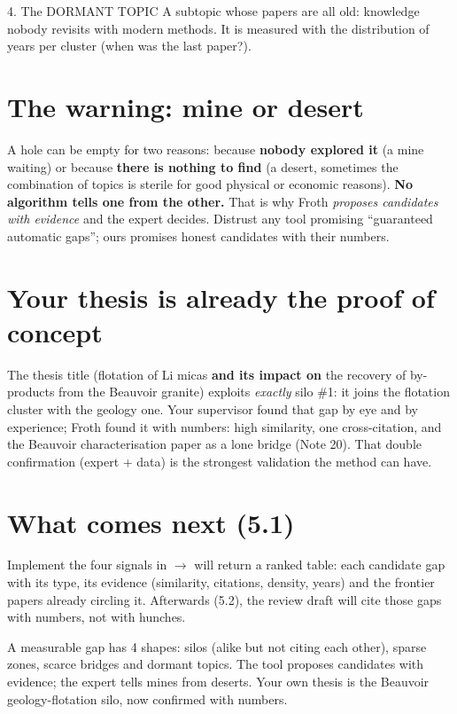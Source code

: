 \documentclass[11pt,a4paper]{article}
\begin{document}
\begin{concepto}{4. The DORMANT TOPIC}
A subtopic whose papers are all old: knowledge nobody revisits with modern methods. It is
measured with the distribution of years per cluster (when was the last paper?).
\end{concepto}

\section{The warning: mine or desert}

\begin{ojo}
A hole can be empty for two reasons: because \textbf{nobody explored it} (a mine waiting) or
because \textbf{there is nothing to find} (a desert, sometimes the combination of topics is
sterile for good physical or economic reasons). \textbf{No algorithm tells one from the
other.} That is why Froth \emph{proposes candidates with evidence} and the expert decides.
Distrust any tool promising ``guaranteed automatic gaps''; ours promises honest candidates
with their numbers.
\end{ojo}

\section{Your thesis is already the proof of concept}

The thesis title (flotation of Li micas \textbf{and its impact on} the recovery of by-products
from the Beauvoir granite) exploits \emph{exactly} silo \#1: it joins the flotation cluster
with the geology one. Your supervisor found that gap by eye and by experience; Froth found it
with numbers: high similarity, one cross-citation, and the Beauvoir characterisation paper as
a lone bridge (Note 20). That double confirmation (expert $+$ data) is the strongest validation
the method can have.

\section{What comes next (5.1)}

Implement the four signals in  $\rightarrow$  will return
a ranked table: each candidate gap with its type, its evidence (similarity, citations,
density, years) and the frontier papers already circling it. Afterwards (5.2), the review
draft will cite those gaps with numbers, not with hunches.

\begin{resumen}
A measurable gap has 4 shapes: silos (alike but not citing each other), sparse zones, scarce
bridges and dormant topics. The tool proposes candidates with evidence; the expert tells mines
from deserts. Your own thesis is the Beauvoir geology-flotation silo, now confirmed with
numbers.
\end{resumen}
\clearpage
{}
{}
\end{document}
